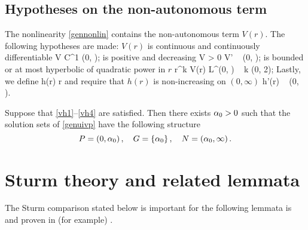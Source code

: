 \subsection{Hypotheses on the non-autonomous term}\label{hypv}
The nonlinearity \eqref{gennonlin} contains the non-autonomous term $V(r)$. The
following hypotheses are made: $V(r)$ is continuous and continuously
differentiable
\be \label{vh1} 
    V \in C^1 (0, \infty); 
\ee
is positive and decreasing
\be \label{vh2} 
    V > 0 \quad {} \quad V'  \quad {} ~ (0, \infty);
\ee
is bounded or at most hyperbolic of quadratic power in $r$
\be \label{vh3}
    r^k V(r) \in L^\infty (0, \infty) \quad {} ~ k \in (0, 2);
\ee
Lastly, we define
\be \label{hdef} h(r) \coloneqq r  \ee
and require that $h(r)$ is non-increasing on $(0, \infty)$ 
\be \label{vh4} h'(r)  \quad {} ~ (0, \infty). \ee

\begin{theorem} \label{genmain}
Suppose that \eqref{vh1}--\eqref{vh4} are satisfied. Then there exists $\alpha_0>0$ such
that the solution sets of \eqref{genuivp} have the following structure
\[
    P = \left( 0, \alpha_0 \right), \quad G = \left\{ \alpha_0 \right\}, \quad N =
    \left( \alpha_0, \infty \right).
\]
\end{theorem}

\section{Sturm theory and related lemmata}
% 
% 
The Sturm comparison stated below is important for the following lemmata is
and proven in (for example) \cite[p.~246]{kwong}.

